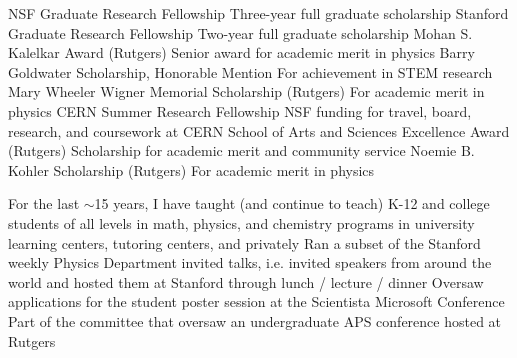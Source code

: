     \cvachievement{\faGraduationCap}
                  {NSF Graduate Research Fellowship}
                  {Three-year full graduate scholarship}
    \cvachievement{\faGraduationCap}
                  {Stanford Graduate Research Fellowship}
                  {Two-year full graduate scholarship}
    \cvachievement{\faGraduationCap}
                  {Mohan S. Kalelkar Award (Rutgers)}
                  {Senior award for academic merit in physics}
    \cvachievement{\faThumbsUp}
                  {Barry Goldwater Scholarship, Honorable Mention}
                  {For achievement in STEM research}
    \cvachievement{\faGraduationCap}
                  {Mary Wheeler Wigner Memorial Scholarship (Rutgers)}
                  {For academic merit in physics}
    \cvachievement{\faGraduationCap}
                  {CERN Summer Research Fellowship}
                  {NSF funding for travel, board, research, and coursework at CERN}
    \cvachievement{\faGraduationCap}
                  {School of Arts and Sciences Excellence Award (Rutgers)}
                  {Scholarship for academic merit and community service}
    \cvachievement{\faGraduationCap}
                  {Noemie B. Kohler Scholarship (Rutgers)}
                  {For academic merit in physics}


        {}
        {}
        {}
        {\small{For the last $\sim$15 years, I have taught (and continue to teach) K-12 and college students of all levels in math, physics, and chemistry programs in university learning centers, tutoring centers, and privately}}
        {}
        {}
        {}
        {\small{Ran a subset of the Stanford weekly Physics Department invited talks, i.e. invited speakers from around the world and hosted them at Stanford through lunch / lecture / dinner}}
        {}
        {}
        {}
        {\small{Oversaw applications for the student poster session at the Scientista Microsoft Conference}}
        {}
        {}
        {}
        {\small{Part of the committee that oversaw an undergraduate APS conference hosted at Rutgers}}

